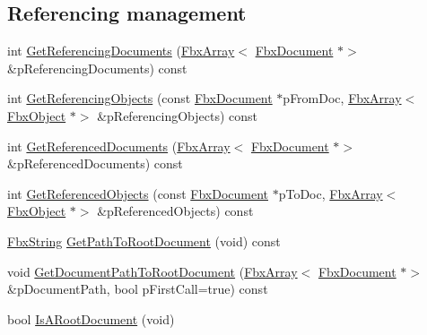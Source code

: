 \subsection*{Referencing management}
\begin{DoxyCompactItemize}
\item 
int \hyperlink{class_fbx_document_a86633de9f5fae33cae2f0313d8f32759}{Get\+Referencing\+Documents} (\hyperlink{class_fbx_array}{Fbx\+Array}$<$ \hyperlink{class_fbx_document}{Fbx\+Document} $\ast$$>$ \&p\+Referencing\+Documents) const
\item 
int \hyperlink{class_fbx_document_a9ca396cbe7d145cfedd2d5028d83e3e7}{Get\+Referencing\+Objects} (const \hyperlink{class_fbx_document}{Fbx\+Document} $\ast$p\+From\+Doc, \hyperlink{class_fbx_array}{Fbx\+Array}$<$ \hyperlink{class_fbx_object}{Fbx\+Object} $\ast$$>$ \&p\+Referencing\+Objects) const
\item 
int \hyperlink{class_fbx_document_a2aa5ab43264511b4f995aeec92e618fb}{Get\+Referenced\+Documents} (\hyperlink{class_fbx_array}{Fbx\+Array}$<$ \hyperlink{class_fbx_document}{Fbx\+Document} $\ast$$>$ \&p\+Referenced\+Documents) const
\item 
int \hyperlink{class_fbx_document_ab515ccdc174d34182eb04cfbd65709ee}{Get\+Referenced\+Objects} (const \hyperlink{class_fbx_document}{Fbx\+Document} $\ast$p\+To\+Doc, \hyperlink{class_fbx_array}{Fbx\+Array}$<$ \hyperlink{class_fbx_object}{Fbx\+Object} $\ast$$>$ \&p\+Referenced\+Objects) const
\item 
\hyperlink{class_fbx_string}{Fbx\+String} \hyperlink{class_fbx_document_a77e3aa2196782836cd7db1f817f9a352}{Get\+Path\+To\+Root\+Document} (void) const
\item 
void \hyperlink{class_fbx_document_acdf3bb31bc3a0e3d2c9a8b73fb2fff30}{Get\+Document\+Path\+To\+Root\+Document} (\hyperlink{class_fbx_array}{Fbx\+Array}$<$ \hyperlink{class_fbx_document}{Fbx\+Document} $\ast$$>$ \&p\+Document\+Path, bool p\+First\+Call=true) const
\item 
bool \hyperlink{class_fbx_document_a34d240ba6a8ac2061343806431d104f9}{Is\+A\+Root\+Document} (void)
\end{DoxyCompactItemize}
